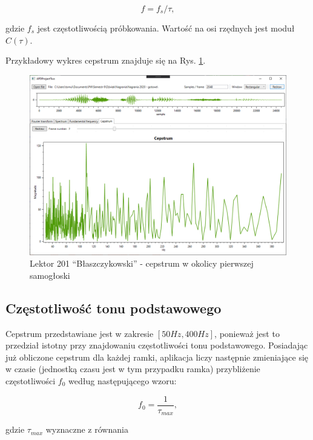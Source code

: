 \documentclass[12pt,a4paper]{article}
\begin{document}
        \begin{equation*}
            f=f_s/\tau,
        \end{equation*}

        gdzie $f_s$ jest częstotliwością próbkowania. Wartość na osi rzędnych jest moduł $C(\tau)$.

        Przykładowy wykres cepstrum znajduje się na Rys. \ref{fig:201_bla_cep}.

        \begin{figure}[h!]
            \centering
            \includegraphics[width=1.0\textwidth]{figures/201_bla_cep}
            \caption{Lektor 201 ``Błaszczykowski'' - cepstrum w okolicy pierwszej samogłoski}
            \label{fig:201_bla_cep}
        \end{figure}


    \subsection{Częstotliwość tonu podstawowego\label{sec:f0}}
        Cepstrum przedstawiane jest w zakresie $[50Hz, 400Hz]$, ponieważ jest to przedział istotny przy znajdowaniu częstotliwości tonu podstawowego. Posiadając już obliczone cepstrum dla każdej ramki, aplikacja liczy następnie zmieniające się w czasie (jednostką czasu jest w tym przypadku ramka) przybliżenie częstotliwości $f_0$ według następującego wzoru:

        \begin{equation*}
            f_0=\frac{1}{\tau_{max}},
        \end{equation*}

        gdzie $\tau_{max}$ wyznaczne z równania
\end{document}
